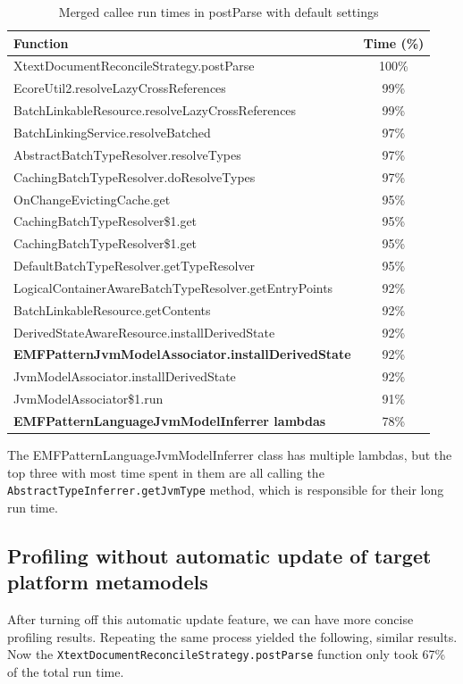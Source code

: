 \documentclass[11pt,a4paper,oneside]{report}
\begin{document}
\begin{table}[ht]
    \footnotesize
    \centering
    \begin{tabular}{ l c }
        \toprule
        Function & Time (\%) \\
        \midrule
        XtextDocumentReconcileStrategy.postParse & 100\% \\
        EcoreUtil2.resolveLazyCrossReferences & 99\% \\
        BatchLinkableResource.resolveLazyCrossReferences & 99\% \\
        BatchLinkingService.resolveBatched & 97\% \\
        AbstractBatchTypeResolver.resolveTypes & 97\% \\
        CachingBatchTypeResolver.doResolveTypes & 97\% \\
        OnChangeEvictingCache.get & 95\% \\
        CachingBatchTypeResolver\$1.get & 95\% \\
        CachingBatchTypeResolver\$1.get & 95\% \\
        DefaultBatchTypeResolver.getTypeResolver & 95\% \\
        LogicalContainerAwareBatchTypeResolver.getEntryPoints & 92\% \\
        BatchLinkableResource.getContents & 92\% \\
        DerivedStateAwareResource.installDerivedState & 92\% \\
        \textbf{EMFPatternJvmModelAssociator.installDerivedState} & 92\% \\
        JvmModelAssociator.installDerivedState & 92\% \\
        JvmModelAssociator\$1.run & 91\% \\
        \textbf{EMFPatternLanguageJvmModelInferrer lambdas} & 78\% \\
        \bottomrule
    \end{tabular}
    \caption{Merged callee run times in postParse with default settings}
    \label{tab:postparse-default}
\end{table}

The EMFPatternLanguageJvmModelInferrer class has multiple lambdas, but the top
three with most time spent in them are all calling the
\texttt{AbstractTypeInferrer.getJvmType} method, which is responsible for their
long run time.

\subsection{Profiling without automatic update of target platform metamodels}
After turning off this automatic update feature, we can have more concise
profiling results. Repeating the same process yielded the following, similar
results. Now the \texttt{XtextDocumentReconcileStrategy.postParse} function only
took 67\% of the total run time.
\end{document}
